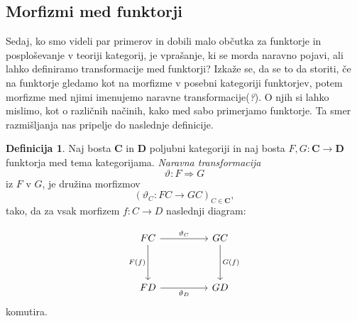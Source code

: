 \documentclass[12pt,a4paper]{book}
\theoremstyle{definition}
\newtheorem{definicija}{Definicija}[chapter]
\theoremstyle{plain}
\theoremstyle{definition}
\theoremstyle{remark}
\newcommand{\cat}[1]{\textbf{#1}}
\begin{document}
\subsection{Morfizmi med funktorji}
Sedaj, ko smo videli par primerov in dobili malo občutka za funktorje in posploševanje v teoriji kategorij, je vprašanje, ki se morda naravno pojavi, ali lahko definiramo transformacije med funktorji? Izkaže se, da se to da storiti, če na funktorje gledamo kot na morfizme v posebni kategoriji funktorjev, potem morfizme med njimi imenujemo naravne transformacije(\emph ?). O njih si lahko mislimo, kot o različnih načinih, kako med sabo primerjamo funktorje. Ta smer razmišljanja nas pripelje do naslednje definicije.

\begin{definicija}
Naj bosta $\cat{C}$ in $\cat{D}$ poljubni kategoriji in naj bosta $F,G : \cat{C} \to \cat{D}$ funktorja med tema kategorijama.
\emph{Naravna transformacija} 
$$\vartheta : F \Rightarrow G$$
iz $F$ v $G$, je družina morfizmov
$$(\vartheta_C : FC \to GC)_{C \in \cat{C}},$$
tako, da za vsak morfizem $f : C \to D$ naslednji diagram:

\begin{equation}
\begin{tikzcd}[sep=huge]
FC \arrow[r, "\vartheta_C"] \arrow[d, "F(f)"'] & GC \arrow[d, "G(f)"] \\
FD \arrow[r, "\vartheta_D"'] & GD
\end{tikzcd}
\end{equation}
komutira.
\end{definicija}
\end{document}
